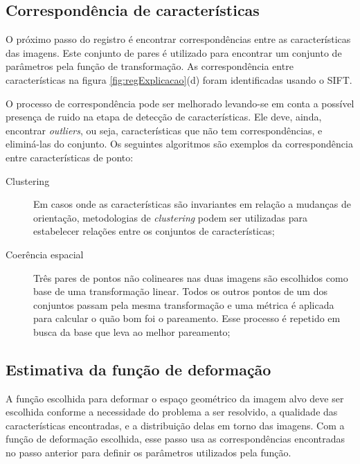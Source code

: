 \subsection{Correspondência de características}

  O próximo passo do registro é encontrar correspondências entre as características das
imagens. Este conjunto de pares é utilizado para encontrar um conjunto de parâmetros
pela função de transformação. As correspondência entre características na figura 
\ref{fig:regExplicacao}(d) foram identificadas usando o SIFT.

  O processo de correspondência pode ser melhorado levando-se em conta a possível
presença de ruido na etapa de detecção de características. Ele deve, ainda, encontrar
\textit{outliers}, ou seja, características que não tem correspondências, e eliminá-las 
do conjunto. Os seguintes algoritmos são exemplos da correspondência entre características 
de ponto:

\begin{description}
    \item [Clustering] Em casos onde as características são invariantes em relação
          a mudanças de orientação, metodologias de \textit{clustering} podem ser utilizadas
          para estabelecer relações entre os conjuntos de características;
    \item [Coerência espacial] Três pares de pontos não colineares nas duas imagens
          são escolhidos como base de uma transformação linear. Todos os outros
          pontos de um dos conjuntos passam pela mesma transformação e uma métrica
          é aplicada para calcular o quão bom foi o pareamento. Esse processo é repetido
          em busca da base que leva ao melhor pareamento;
\end{description}

\subsection{Estimativa da função de deformação}

  A função escolhida para deformar o espaço geométrico da imagem alvo deve ser
escolhida conforme a necessidade do problema a ser resolvido, a qualidade das
características encontradas, e a distribuição delas em torno das imagens. Com a
função de deformação escolhida, esse passo usa as correspondências encontradas
no passo anterior para definir os parâmetros utilizados pela função.

